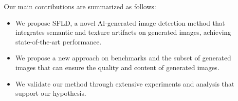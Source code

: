 Our main contributions are summarized as follows: 
\begin{itemize}[leftmargin=*]
    \setlength\itemsep{0.0em}
    \item We propose SFLD, a novel AI-generated image detection method that integrates semantic and texture artifacts on generated images, achieving state-of-the-art performance.
    \item We propose a new approach on benchmarks and the subset of generated images that can ensure the quality and content of generated images.
    \item We validate our method through extensive experiments and analysis that support our hypothesis.
\end{itemize}
